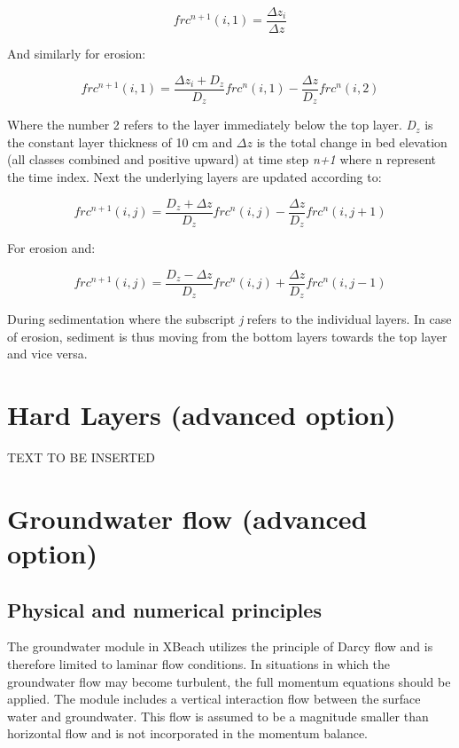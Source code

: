 \begin{equation} \label{2.77)} 
frc^{n+1} (i,1)=\frac{\Delta z_{i} }{\Delta z}  
\end{equation} 

And similarly for erosion:

\begin{equation} \label{2.78)} 
frc^{n+1} (i,1)=\frac{\Delta z_{i} +D_{z} }{D_{z} } frc^{n} (i,1)-\frac{\Delta z}{D_{z} } frc^{n} (i,2) 
\end{equation} 

Where the number 2 refers to the layer immediately below the top layer. \textit{D${}_{z}$} is the constant layer thickness of 10 cm and $\Delta z$ is the total change in bed elevation (all classes combined and positive upward) at time step \textit{n+1} where n represent the time index. Next the underlying layers are updated according to:

\begin{equation} \label{2.79)} 
frc^{n+1} (i,j)=\frac{D_{z} +\Delta z}{D_{z} } frc^{n} (i,j)-\frac{\Delta z}{D_{z} } frc^{n} (i,j+1) 
\end{equation} 

For erosion and:

\begin{equation} \label{2.80)} 
frc^{n+1} (i,j)=\frac{D_{z} -\Delta z}{D_{z} } frc^{n} (i,j)+\frac{\Delta z}{D_{z} } frc^{n} (i,j-1) 
\end{equation} 

During sedimentation where the subscript \textit{j} refers to the individual layers. In case of erosion, sediment is thus moving from the bottom layers towards the top layer and vice versa.

\section{ Hard Layers (advanced option)}

TEXT TO BE INSERTED

\section{ Groundwater flow (advanced option)}
\subsection{ Physical and numerical principles}

The groundwater module in XBeach utilizes the principle of Darcy flow and is therefore limited to laminar flow conditions. In situations in which the groundwater flow may become turbulent, the full momentum equations \citep[e.g.][]{VanGent1995} should be applied. The module includes a vertical interaction flow between the surface water and groundwater. This flow is assumed to be a magnitude smaller than horizontal flow and is not incorporated in the momentum balance.

